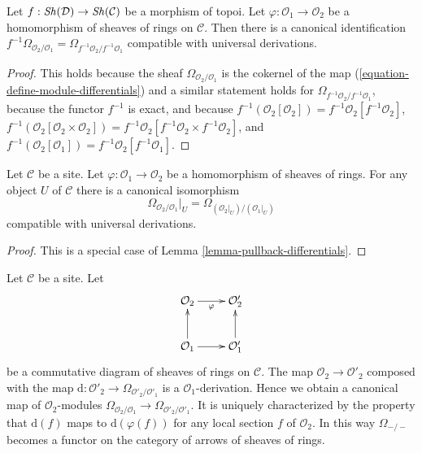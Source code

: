 \begin{lemma}
\label{lemma-pullback-differentials}
Let $f : \mathop{\mathit{Sh}}\nolimits(\mathcal{D}) \to \mathop{\mathit{Sh}}\nolimits(\mathcal{C})$ be a morphism of topoi.
Let $\varphi : \mathcal{O}_1 \to \mathcal{O}_2$
be a homomorphism of sheaves of rings on $\mathcal{C}$.
Then there is a canonical identification
$f^{-1}\Omega_{\mathcal{O}_2/\mathcal{O}_1} =
\Omega_{f^{-1}\mathcal{O}_2/f^{-1}\mathcal{O}_1}$
compatible with universal derivations.
\end{lemma}

\begin{proof}
This holds because the sheaf $\Omega_{\mathcal{O}_2/\mathcal{O}_1}$
is the cokernel of the map (\ref{equation-define-module-differentials})
and a similar statement holds for
$\Omega_{f^{-1}\mathcal{O}_2/f^{-1}\mathcal{O}_1}$,
because the functor $f^{-1}$ is exact, and because
$f^{-1}(\mathcal{O}_2[\mathcal{O}_2]) =
f^{-1}\mathcal{O}_2[f^{-1}\mathcal{O}_2]$,
$f^{-1}(\mathcal{O}_2[\mathcal{O}_2 \times \mathcal{O}_2]) =
f^{-1}\mathcal{O}_2[f^{-1}\mathcal{O}_2 \times f^{-1}\mathcal{O}_2]$, and
$f^{-1}(\mathcal{O}_2[\mathcal{O}_1]) =
f^{-1}\mathcal{O}_2[f^{-1}\mathcal{O}_1]$.
\end{proof}

\begin{lemma}
\label{lemma-localize-differentials}
Let $\mathcal{C}$ be a site. Let $\varphi : \mathcal{O}_1 \to \mathcal{O}_2$
be a homomorphism of sheaves of rings. For any object $U$ of $\mathcal{C}$
there is a canonical isomorphism
$$
\Omega_{\mathcal{O}_2/\mathcal{O}_1}|_U =
\Omega_{(\mathcal{O}_2|_U)/(\mathcal{O}_1|_U)}
$$
compatible with universal derivations.
\end{lemma}

\begin{proof}
This is a special case of Lemma \ref{lemma-pullback-differentials}.
\end{proof}

\begin{lemma}
\label{lemma-functoriality-differentials}
Let $\mathcal{C}$ be a site. Let
$$
\xymatrix{
\mathcal{O}_2 \ar[r]_\varphi & \mathcal{O}_2' \\
\mathcal{O}_1 \ar[r] \ar[u] & \mathcal{O}'_1 \ar[u]
}
$$
be a commutative diagram of sheaves of rings on $\mathcal{C}$. The map
$\mathcal{O}_2 \to \mathcal{O}'_2$ composed with the map
$\text{d} : \mathcal{O}'_2 \to \Omega_{\mathcal{O}'_2/\mathcal{O}'_1}$
is a $\mathcal{O}_1$-derivation. Hence we obtain a canonical map of
$\mathcal{O}_2$-modules
$\Omega_{\mathcal{O}_2/\mathcal{O}_1} \to
\Omega_{\mathcal{O}'_2/\mathcal{O}'_1}$.
It is uniquely characterized by the property that
$\text{d}(f)$ maps to $\text{d}(\varphi(f))$
for any local section $f$ of $\mathcal{O}_2$.
In this way $\Omega_{-/-}$ becomes a functor on the category
of arrows of sheaves of rings.
\end{lemma}

